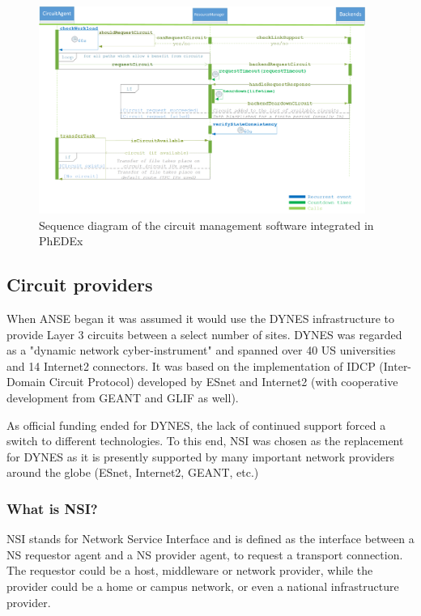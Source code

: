 \begin{figure}[h]
  \centering
  \includegraphics[width=0.95\textwidth]{Figures/Circuit_framework-sequence_diagram.png}
  \caption{Sequence diagram of the circuit management software integrated in PhEDEx}
  \label{fig:sequence_diagram}
\end{figure} 

\subsection{Circuit providers}

When ANSE began it was assumed it would use the DYNES infrastructure to provide Layer 3 circuits 
between a select number of sites. DYNES was regarded as a "dynamic network cyber-instrument"
and spanned over 40 US universities and 14 Internet2 connectors. It was based on the 
implementation of IDCP (Inter-Domain Circuit Protocol) developed by ESnet and Internet2 
(with cooperative development from GEANT and GLIF as well).

As official funding ended for DYNES, the lack of continued support forced a switch to different 
technologies. To this end, NSI was chosen as the replacement for DYNES as it is presently 
supported by many important network providers around the globe (ESnet, Internet2, GEANT, etc.)

\subsubsection{What is NSI?}

NSI stands for Network Service Interface and is defined as the interface between a
NS requestor agent and a NS provider agent, to request a transport connection.
The requestor could be a host, middleware or network provider, while the provider 
could be a home or campus network, or even a national infrastructure provider.

